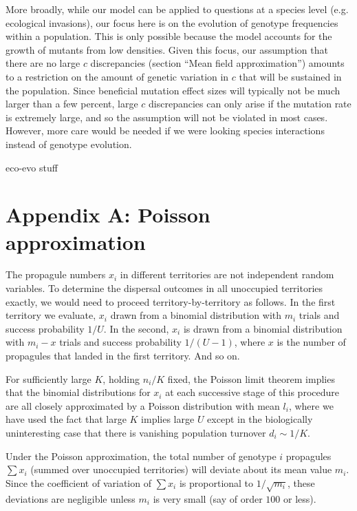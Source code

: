 \documentclass[11pt]{article}
\begin{document}
More broadly, while our model can be applied to questions at a species level (e.g. ecological invasions), our focus here is on the evolution of genotype frequencies within a population. This is only possible because the model accounts for the growth of mutants from low densities. Given this focus, our assumption that there are no large $c$ discrepancies (section ``Mean field approximation'') amounts to a restriction on the amount of genetic variation in $c$ that will be sustained in the population. Since beneficial mutation effect sizes will typically not be much larger than a few percent, large $c$ discrepancies can only arise if the mutation rate is extremely large, and so the assumption will not be violated in most cases. However, more care would be needed if we were looking species interactions instead of genotype evolution.



eco-evo stuff






 

\section*{Appendix A: Poisson approximation}

The propagule numbers $x_i$ in different territories are not independent random variables. To determine the dispersal outcomes in all unoccupied territories exactly, we would need to proceed territory-by-territory as follows. In the first territory we evaluate, $x_i$ drawn from a binomial distribution with $m_i$ trials and success probability $1/U$. In the second, $x_i$ is drawn from a binomial distribution with $m_i-x$ trials and success probability $1/(U-1)$, where $x$ is the number of propagules that landed in the first territory. And so on.

For sufficiently large $K$, holding $n_i/K$ fixed, the Poisson limit theorem implies that the binomial distributions for $x_i$ at each successive stage of this procedure are all closely approximated by a Poisson distribution with mean $l_i$, where we have used the fact that large $K$ implies large $U$ except in the biologically uninteresting case that there is vanishing population turnover $d_i \sim 1/K$. 

Under the Poisson approximation, the total number of genotype $i$ propagules $\sum x_i$ (summed over unoccupied territories) will deviate about its mean value $m_i$. Since the coefficient of variation of $\sum x_i$ is proportional to $1/\sqrt{m_i}$, these deviations are negligible unless $m_i$ is very small (say of order $100$ or less).
\end{document}
